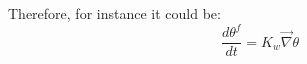 Therefore, for instance it could be:
\begin{equation}
\frac{d \theta^f}{dt} = K_w \vec{\nabla}{\theta}
\end{equation}